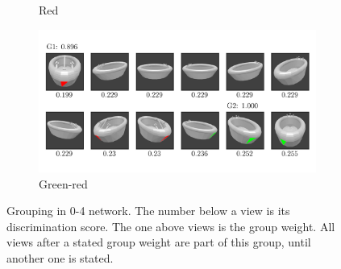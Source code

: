 \begin{figure}
\begin{subfigure}{\textwidth}
		\caption{Red}
		\label{fig:grouping-0-4-red}
	\end{subfigure}
	\begin{subfigure}{\textwidth}
		\includegraphics[trim=10 20 10 20, clip]{images/mn-sl-0-4-20/bathtub_0107_3_grouping.png}
		\caption{Green-red}
		\label{fig:grouping-0-4-green-red}
	\end{subfigure}
	\caption[Grouping in 0-4 network]{Grouping in 0-4 network. The number below a view is its discrimination score. The one above views is the group weight. All views after a stated group weight are part of this group, until another one is stated.}
	\label{fig:grouping-0-4}
\end{figure}

